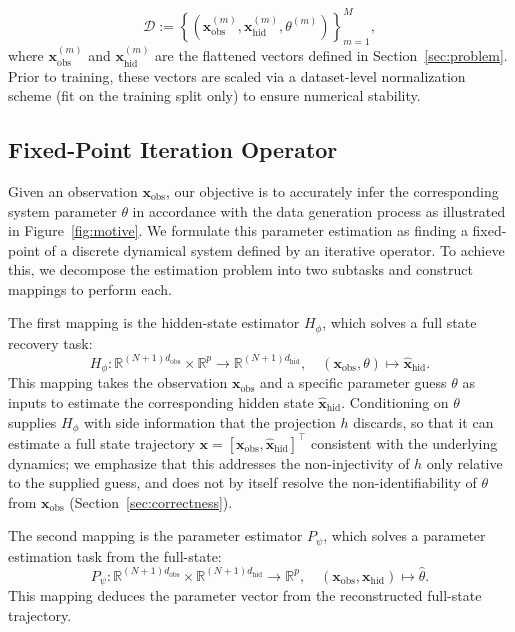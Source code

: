 \begin{equation}
\label{eq:training-samples}
\mathcal{D}:=\left\{(\mathbf{x}_{\mathrm{obs}}^{(m)},\mathbf{x}_{\mathrm{hid}}^{(m)},\theta^{(m)})\right\}_{m=1}^M,
\end{equation}
where $\mathbf{x}_{\mathrm{obs}}^{(m)}$ and $\mathbf{x}_{\mathrm{hid}}^{(m)}$ are the flattened vectors defined in Section~\ref{sec:problem}.
Prior to training, these vectors are scaled via a dataset-level normalization scheme (fit on the training split only) to ensure numerical stability.

\subsection{Fixed-Point Iteration Operator}

Given an observation $\mathbf{x}_\mathrm{obs}$, our objective is to accurately infer the corresponding system parameter $\theta$ in accordance with the data generation process as illustrated in Figure~\ref{fig:motive}.
We formulate this parameter estimation as finding a fixed-point of a discrete dynamical system defined by an iterative operator. 
To achieve this, we decompose the estimation problem into two subtasks and construct mappings to perform each.

The first mapping is the hidden-state estimator $H_\phi$, which solves a full state recovery task:
\begin{equation}
    \label{eq:H-map}
        H_\phi:\mathbb{R}^{(N+1)d_{\mathrm{obs}}}\times \mathbb{R}^{p}\to \mathbb{R}^{(N+1)d_{\mathrm{hid}}},
            \quad
        (\mathbf{x}_\mathrm{obs},\theta) \mapsto \hat{\mathbf{x}}_{\mathrm{hid}}.
\end{equation}
This mapping takes the observation $\mathbf{x}_\mathrm{obs}$ and a specific parameter guess $\theta$ as inputs to estimate the corresponding hidden state $\hat{\mathbf{x}}_{\mathrm{hid}}$.
Conditioning on $\theta$ supplies $H_\phi$ with side information that the projection $h$ discards, so that it can estimate a full state trajectory $\mathbf{x}=[\mathbf{x}_\mathrm{obs}, \hat{\mathbf{x}}_\mathrm{hid}]^\top$ consistent with the underlying dynamics; we emphasize that this addresses the non-injectivity of $h$ only relative to the supplied guess, and does not by itself resolve the non-identifiability of $\theta$ from $\mathbf{x}_\mathrm{obs}$ (Section~\ref{sec:correctness}).

The second mapping is the parameter estimator $P_\psi$, which solves a parameter estimation task from the full-state:
\begin{equation}
\label{eq:P-map}
    P_\psi:\mathbb{R}^{(N+1)d_{\mathrm{obs}}}\times \mathbb{R}^{(N+1)d_{\mathrm{hid}}}\to \mathbb{R}^{p},
    \quad
    (\mathbf{x}_\mathrm{obs},\mathbf{x}_{\mathrm{hid}}) \mapsto \hat{\theta}.
\end{equation}
This mapping deduces the parameter vector from the reconstructed full-state trajectory.

